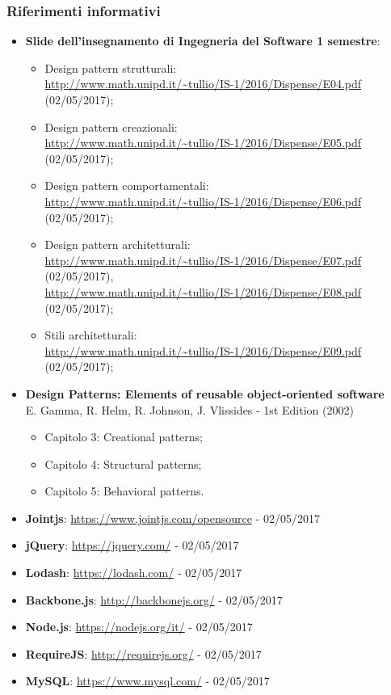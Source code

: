 \documentclass[../PianoDiQualifica.tex]{subfiles}
\begin{document}
			\subsubsection{Riferimenti informativi}	
				\begin{itemize}
					\item \textbf{Slide dell'insegnamento di Ingegneria del Software
					1 semestre}:
					\begin{itemize}
						\item Design pattern strutturali:\\
						\url{http://www.math.unipd.it/~tullio/IS-1/2016/Dispense/E04.pdf} (02/05/2017);
						\item Design pattern creazionali:\\
						\url{http://www.math.unipd.it/~tullio/IS-1/2016/Dispense/E05.pdf} (02/05/2017);
						\item Design pattern comportamentali:\\
						\url{http://www.math.unipd.it/~tullio/IS-1/2016/Dispense/E06.pdf} (02/05/2017);
						\item Design pattern architetturali:\\
						\url{http://www.math.unipd.it/~tullio/IS-1/2016/Dispense/E07.pdf} (02/05/2017),\\
						\url{http://www.math.unipd.it/~tullio/IS-1/2016/Dispense/E08.pdf} (02/05/2017);
						\item Stili architetturali:\\
						\url{http://www.math.unipd.it/~tullio/IS-1/2016/Dispense/E09.pdf} (02/05/2017);
					\end{itemize}
					\item \textbf{Design Patterns: Elements of reusable object-oriented software}\\
					E. Gamma, R. Helm, R. Johnson, J. Vlissides - 1st Edition (2002)
					\begin{itemize}
						\item Capitolo 3: Creational patterns;
						\item Capitolo 4: Structural patterns;
						\item Capitolo 5: Behavioral patterns.
					\end{itemize}
					\item \textbf{Jointjs}: \url{https://www.jointjs.com/opensource} - 02/05/2017
					\item \textbf{jQuery}: \url{https://jquery.com/} - 02/05/2017
					\item \textbf{Lodash}: \url{https://lodash.com/} - 02/05/2017
					\item \textbf{Backbone.js}: \url{http://backbonejs.org/} - 02/05/2017
					\item \textbf{Node.js}: \url{https://nodejs.org/it/} - 02/05/2017
					\item \textbf{RequireJS}: \url{http://requirejs.org/} - 02/05/2017
					\item \textbf{MySQL}: \url{https://www.mysql.com/} - 02/05/2017
				\end{itemize}
\end{document}
